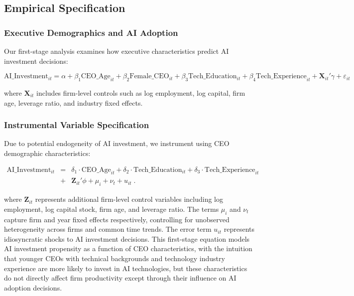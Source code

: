 \documentclass[12pt, a4paper]{article}
\begin{document}
\subsection{Empirical Specification}

\subsubsection{Executive Demographics and AI Adoption}

Our first-stage analysis examines how executive characteristics predict AI investment decisions:

\begin{equation}
\text{AI}\_\text{Investment}_{it} = \alpha + \beta_1 \text{CEO}\_\text{Age}_{it} + \beta_2 \text{Female}\_\text{CEO}_{it} + \beta_3 \text{Tech}\_\text{Education}_{it} + \beta_4 \text{Tech}\_\text{Experience}_{it} + \mathbf{X}_{it}'\gamma + \varepsilon_{it}
\end{equation}

where $\mathbf{X}_{it}$ includes firm-level controls such as log employment, log capital, firm age, leverage ratio, and industry fixed effects.

\subsubsection{Instrumental Variable Specification}

Due to potential endogeneity of AI investment, we instrument using CEO demographic characteristics:

\begin{eqnarray}
\text{AI}\_\text{Investment}_{it} &=& \delta_1 \cdot \text{CEO}\_\text{Age}_{it} + \delta_2 \cdot \text{Tech}\_\text{Education}_{it} 
+ \delta_3 \cdot \text{Tech}\_\text{Experience}_{it} \nonumber \\
&+& \mathbf{Z}_{it}'\phi + \mu_i + \nu_t + u_{it} \;.
\end{eqnarray}

where $\mathbf{Z}_{it}$ represents additional firm-level control variables including log employment, log capital stock, firm age, and leverage ratio. The terms $\mu_i$ and $\nu_t$ capture firm and year fixed effects respectively, controlling for unobserved heterogeneity across firms and common time trends. The error term $u_{it}$ represents idiosyncratic shocks to AI investment decisions. This first-stage equation models AI investment propensity as a function of CEO characteristics, with the intuition that younger CEOs with technical backgrounds and technology industry experience are more likely to invest in AI technologies, but these characteristics do not directly affect firm productivity except through their influence on AI adoption decisions.
\end{document}
